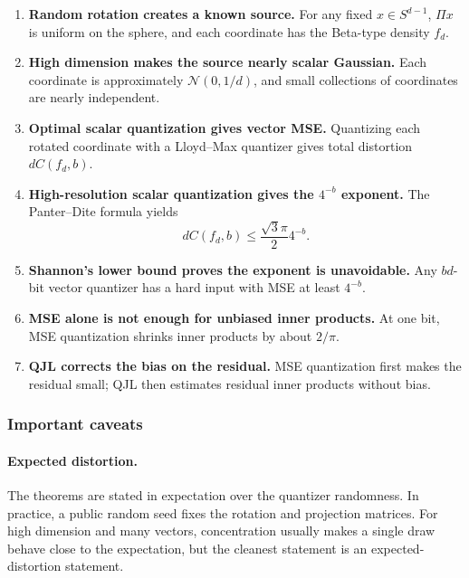 \begin{enumerate}[leftmargin=2em]
    \item \textbf{Random rotation creates a known source.}
    For any fixed $x\in S^{d-1}$, $\Pi x$ is uniform on the sphere, and each coordinate has the Beta-type density $f_d$.

    \item \textbf{High dimension makes the source nearly scalar Gaussian.}
    Each coordinate is approximately $\mathcal N(0,1/d)$, and small collections of coordinates are nearly independent.

    \item \textbf{Optimal scalar quantization gives vector MSE.}
    Quantizing each rotated coordinate with a Lloyd--Max quantizer gives total distortion $dC(f_d,b)$.

    \item \textbf{High-resolution scalar quantization gives the $4^{-b}$ exponent.}
    The Panter--Dite formula yields
    \[
        dC(f_d,b)\le \frac{\sqrt 3\pi}{2}4^{-b}.
    \]

    \item \textbf{Shannon's lower bound proves the exponent is unavoidable.}
    Any $bd$-bit vector quantizer has a hard input with MSE at least $4^{-b}$.

    \item \textbf{MSE alone is not enough for unbiased inner products.}
    At one bit, MSE quantization shrinks inner products by about $2/\pi$.

    \item \textbf{QJL corrects the bias on the residual.}
    MSE quantization first makes the residual small; QJL then estimates residual inner products without bias.
\end{enumerate}

\subsubsection*{Important caveats}

\paragraph{Expected distortion.}
The theorems are stated in expectation over the quantizer randomness.
In practice, a public random seed fixes the rotation and projection matrices.
For high dimension and many vectors, concentration usually makes a single draw behave close to the expectation, but the cleanest statement is an expected-distortion statement.

